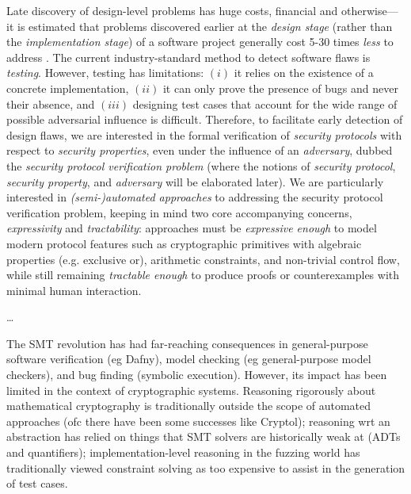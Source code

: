 \documentclass{article}
\theoremstyle{definition}
\begin{document}
Late discovery of design-level problems has huge costs, financial and otherwise---it is estimated 
that problems discovered earlier at the \textit{design stage} (rather than the \textit{implementation stage}) 
of a software project
generally cost 5-30 times \emph{less} to address \cite{fm}. 
The current industry-standard method to detect software flaws is \textit{testing}. 
However, testing has limitations: $(i)$ it relies on the existence of a concrete implementation, 
$(ii)$ it can only prove the presence of bugs and never their absence, 
and $(iii)$ designing test cases that account for the wide range of possible adversarial influence is difficult. 
Therefore, to facilitate early detection of design flaws, we are interested in the formal verification of 
\textit{security protocols} with respect to \textit{security properties}, 
even under the influence of an \textit{adversary}, 
dubbed the \textit{security protocol verification problem} 
(where the notions of \textit{security protocol}, \textit{security property}, and \textit{adversary} will be elaborated later). 
We are particularly interested in \emph{(semi-)automated approaches} to addressing the 
security protocol verification problem, keeping in mind two core accompanying concerns,
\emph{expressivity} and \emph{tractability}:
approaches must be \emph{expressive enough} to model modern protocol features such as cryptographic primitives with 
algebraic properties (e.g. exclusive or), arithmetic constraints, and non-trivial control flow, 
while still remaining \emph{tractable enough} to produce proofs or counterexamples with minimal human interaction. 

\dots  

The SMT revolution has had far-reaching consequences in general-purpose 
software verification (eg Dafny), model checking (eg general-purpose model checkers), 
and bug finding (symbolic execution). 
However, its impact has been limited in the context of 
cryptographic systems. 
Reasoning rigorously about mathematical cryptography is traditionally outside the scope of 
automated approaches (ofc there have been some successes like Cryptol); 
reasoning wrt an abstraction has relied on things that SMT solvers are historically weak at (ADTs and quantifiers); 
implementation-level reasoning in the fuzzing world has traditionally viewed constraint solving as too expensive 
to assist in the generation of test cases.
\end{document}
